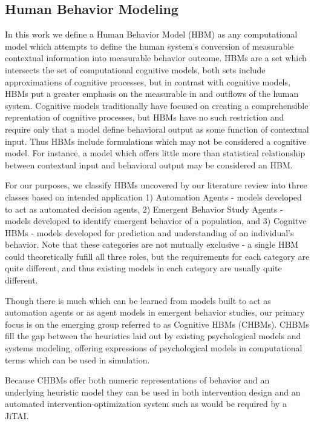 \documentclass[conference]{IEEEtran}
\begin{document}
\subsection{Human Behavior Modeling}
In this work we define a Human Behavior Model (HBM) as any computational model which attempts to define the human system’s conversion of measurable contextual information into measurable behavior outcome. 
HBMs are a set which intersects the set of computational cognitive models, both sets include approximations of cognitive processes, but in contrast with cognitive models, HBMs put a greater emphasis on the measurable in and outflows of the human system.
Cognitive models traditionally have focused on creating a comprehensible reprentation of cognitive processes, but HBMs have no such restriction and require only that a model define behavioral output as some function of contextual input.
Thus HBMs include formulations which may not be considered a cognitive model.
For instance, a model which offers little more than statistical relationship between contextual input and behavioral output may be considered an HBM.

For our purposes, we classify HBMs uncovered by our literature review into three classes based on intended application 1) Automation Agents - models developed to act as automated decision agents, 2) Emergent Behavior Study Agents - models developed to identify emergent behavior of a population, and 3) Cognitve HBMs - models developed for prediction and understanding of an individual's behavior.
Note that these categories are not mutually exclusive - a single HBM could theoretically fufill all three roles, but the requirements for each category are quite different, and thus existing models in each category are usually quite different.

Though there is much which can be learned from models built to act as automation agents or as agent models in emergent behavior studies, our primary focus is on the emerging group referred to as Cognitive HBMs (CHBMs).
CHBMs fill the gap between the heuristics laid out by existing psychological models and systems modeling, offering expressions of psychological models in computational terms which can be used in simulation.

Because CHBMs offer both numeric representations of behavior and an underlying heuristic model they can be used in both intervention design and an automated intervention-optimization system such as would be required by a JiTAI.

\end{document}
